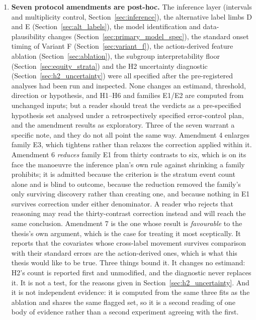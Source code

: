 \begin{enumerate}
    \item \textbf{Seven protocol amendments are post-hoc.} The inference layer
    (intervals and multiplicity control, Section~\ref{sec:inference}), the
    alternative label limbs D and E (Section~\ref{sec:alt_labels}), the model
    identification and data-plausibility changes
    (Section~\ref{sec:primary_model_spec}), the standard onset timing of
    Variant F (Section~\ref{sec:variant_f}), the action-derived feature
    ablation (Section~\ref{sec:ablation}), the subgroup interpretability
    floor (Section~\ref{sec:equity_strata}) and the H2 uncertainty diagnostic
    (Section~\ref{sec:h2_uncertainty}) were all specified after the
    pre-registered analyses had been run and inspected. None changes an
    estimand, threshold, direction or hypothesis, and H1--H6 and families E1/E2
    are computed from unchanged inputs; but a reader should treat the verdicts
    as a pre-specified hypothesis set analysed under a retrospectively specified
    error-control plan, and the amendment results as exploratory. Three of the
    seven warrant a specific note, and they do not all point the same way.
    Amendment 4 enlarges family E3, which tightens rather than relaxes the
    correction applied within it.
    Amendment 6 \emph{reduces} family E1 from thirty contrasts to six, which is
    on its face the manoeuvre the inference plan's own rule against shrinking a
    family prohibits; it is admitted because the criterion is the stratum event
    count alone and is blind to outcome, because the reduction removed the
    family's only surviving discovery rather than creating one, and because
    nothing in E1 survives correction under either denominator. A reader who
    rejects that reasoning may read the thirty-contrast correction instead and
    will reach the same conclusion.
    Amendment 7 is the one whose result is \emph{favourable} to the thesis's own
    argument, which is the case for treating it most sceptically. It reports
    that the covariates whose cross-label movement survives comparison with
    their standard errors are the action-derived ones, which is what this thesis
    would like to be true. Three things bound it. It changes no estimand: H2's
    count is reported first and unmodified, and the diagnostic never replaces
    it. It is not a test, for the reasons given in
    Section~\ref{sec:h2_uncertainty}. And it is not independent evidence: it is
    computed from the same three fits as the ablation and shares the same
    flagged set, so it is a second reading of one body of evidence rather than a
    second experiment agreeing with the first.


\end{enumerate}
